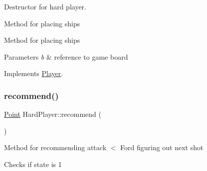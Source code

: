 Destructor for hard player. 

Method for placing ships

Method for placing ships 
\begin{DoxyParams}{Parameters}
{\em b} & reference to game board \\
\hline
\end{DoxyParams}


Implements \mbox{\hyperlink{class_player_ab89c1180c7314d3e19bcf4b2bed2e02a}{Player}}.

\mbox{\label{class_hard_player_ae1d21325a648a88f1bf51f2b0b286190}} 
\subsubsection{\texorpdfstring{recommend()}{recommend()}}
{\footnotesize\ttfamily \mbox{\hyperlink{class_point}{Point}} Hard\+Player\+::recommend (\begin{DoxyParamCaption}{ }\end{DoxyParamCaption})\hspace{0.3cm}{\ttfamily [virtual]}}

Method for recommending attack $<$ Ford figuring out next shot

Checks if state is 1

